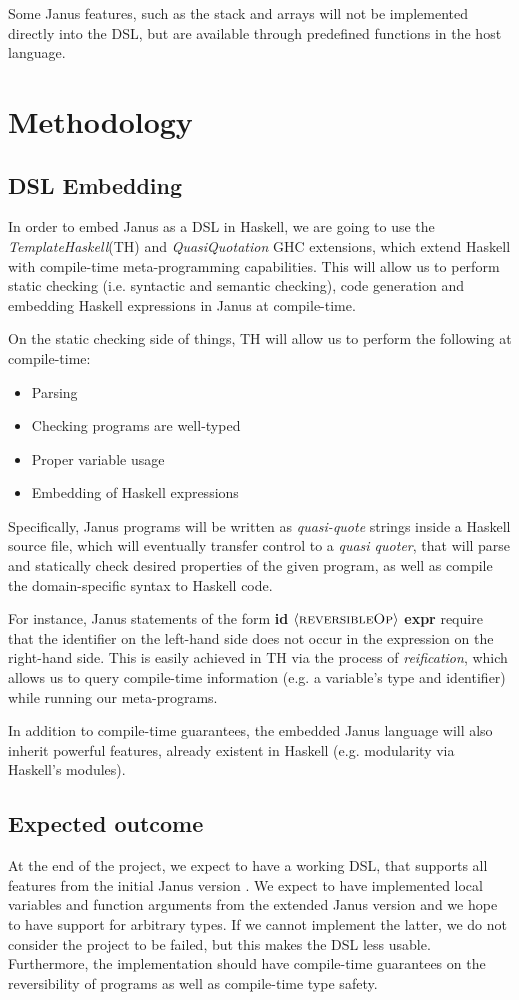\documentclass[12pt,a4paper]{article}
\begin{document}
    Some Janus features, such as the stack and arrays will not be implemented directly into the DSL, but are available through predefined functions in the host language.
\section{Methodology}
\subsection{DSL Embedding}
\label{subsec:template-haskell}
In order to embed Janus as a DSL in Haskell, we are going to use the \textit{TemplateHaskell}(TH)\cite{sheard02} and \textit{QuasiQuotation}\cite{mainland07} GHC extensions, which extend Haskell with compile-time meta-programming capabilities. This will allow us to perform static checking (i.e. syntactic and semantic checking), code generation and embedding Haskell expressions in Janus at compile-time.

On the static checking side of things, TH will allow us to perform the following at compile-time:
\begin{itemize}
    \item{Parsing}
    \item{Checking programs are well-typed}
    \item{Proper variable usage}
    \item{Embedding of Haskell expressions}
\end{itemize}

Specifically, Janus programs will be written as \textit{quasi-quote} strings inside a Haskell source file, which will eventually transfer control to a \textit{quasi quoter}, that will parse and statically check desired properties of the given program, as well as compile the domain-specific syntax to Haskell code.

For instance, Janus statements of the form \textbf{id} $\langle\textsc{reversibleOp}\rangle$ \textbf{expr} require that the identifier on the left-hand side does not occur in the expression on the right-hand side. This is easily achieved in TH via the process of \textit{reification}, which allows us to query compile-time information (e.g. a variable's type and identifier) while running our meta-programs.

In addition to compile-time guarantees, the embedded Janus language will also inherit powerful features, already existent in Haskell (e.g. modularity via Haskell's modules).

\subsection{Expected outcome}
At the end of the project, we expect to have a working DSL, that supports all features from the initial Janus version \cite{lutz82}. We expect to have implemented local variables and function arguments from the extended Janus version \cite{yokoyama10} and we hope to have support for arbitrary types. If we cannot implement the latter, we do not consider the project to be failed, but this makes the DSL less usable. Furthermore, the implementation should have compile-time guarantees on the reversibility of programs as well as compile-time type safety. 
\end{document}
